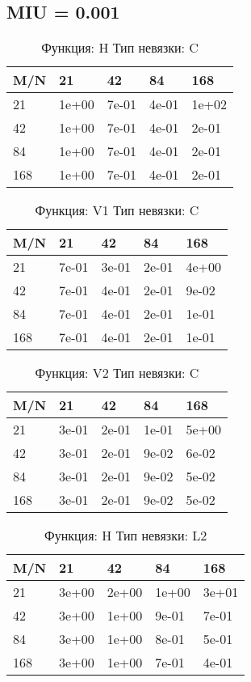 \documentclass[a4paper,11pt]{article}
\begin{document}
\subsection{MIU = 0.001}
\begin{table}[H]
\caption {Функция: H Тип невязки: C   }
\begin{center}
\begin{tabular}{l|l|l|l|l}
\hline
M/N  & 21 & 42 & 84 & 168 \\ \hline
  21 & 1e+00& 7e-01& 4e-01& 1e+02\\ \hline
  42 & 1e+00& 7e-01& 4e-01& 2e-01\\ \hline
  84 & 1e+00& 7e-01& 4e-01& 2e-01\\ \hline
 168 & 1e+00& 7e-01& 4e-01& 2e-01\\ \hline
\end{tabular}
\end{center}
\end{table}
\begin{table}[H]
\caption {Функция: V1 Тип невязки: C   }
\begin{center}
\begin{tabular}{l|l|l|l|l}
\hline
M/N  & 21 & 42 & 84 & 168 \\ \hline
  21 & 7e-01& 3e-01& 2e-01& 4e+00\\ \hline
  42 & 7e-01& 4e-01& 2e-01& 9e-02\\ \hline
  84 & 7e-01& 4e-01& 2e-01& 1e-01\\ \hline
 168 & 7e-01& 4e-01& 2e-01& 1e-01\\ \hline
\end{tabular}
\end{center}
\end{table}
\begin{table}[H]
\caption {Функция: V2 Тип невязки: C   }
\begin{center}
\begin{tabular}{l|l|l|l|l}
\hline
M/N  & 21 & 42 & 84 & 168 \\ \hline
  21 & 3e-01& 2e-01& 1e-01& 5e+00\\ \hline
  42 & 3e-01& 2e-01& 9e-02& 6e-02\\ \hline
  84 & 3e-01& 2e-01& 9e-02& 5e-02\\ \hline
 168 & 3e-01& 2e-01& 9e-02& 5e-02\\ \hline
\end{tabular}
\end{center}
\end{table}
\begin{table}[H]
\caption {Функция: H Тип невязки: L2  }
\begin{center}
\begin{tabular}{l|l|l|l|l}
\hline
M/N  & 21 & 42 & 84 & 168 \\ \hline
  21 & 3e+00& 2e+00& 1e+00& 3e+01\\ \hline
  42 & 3e+00& 1e+00& 9e-01& 7e-01\\ \hline
  84 & 3e+00& 1e+00& 8e-01& 5e-01\\ \hline
 168 & 3e+00& 1e+00& 7e-01& 4e-01\\ \hline
\end{tabular}
\end{center}
\end{table}
\end{document}
